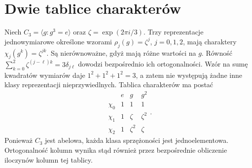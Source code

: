 \section{Dwie tablice charakterów}
\begin{przyklad}
\label{aa:prz:character-c3}
Niech \(C_3=\langle g:g^3=e\rangle\) oraz
\(\zeta=\exp(2\pi i/3)\). Trzy reprezentacje
jednowymiarowe określone wzorami
\(\rho_j(g)=\zeta^j\), \(j=0,1,2\), mają charaktery
\(\chi_j(g^k)=\zeta^{jk}\).
Są nierównoważne, gdyż mają różne wartości na \(g\).
Równość
\(\sum_{k=0}^2\zeta^{(j-\ell)k}
=3\delta_{j\ell}\) dowodzi bezpośrednio ich
ortogonalności. Wzór na sumę kwadratów wymiarów
daje \(1^2+1^2+1^2=3\), a zatem nie występują
żadne inne klasy reprezentacji nieprzywiedlnych.
Tablica charakterów ma postać
\[
\begin{array}{c|ccc}
 & e & g & g^2\\ \hline
\chi_0&1&1&1\\
\chi_1&1&\zeta&\zeta^2\\
\chi_2&1&\zeta^2&\zeta
\end{array}.
\]
Ponieważ \(C_3\) jest abelowa, każda klasa
sprzężoności jest jednoelementowa. Ortogonalność
kolumn wynika stąd również przez bezpośrednie
obliczenie iloczynów kolumn tej tablicy.
\end{przyklad}

